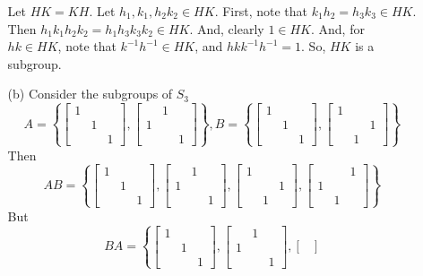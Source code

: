 \begin{itemize}
\begin{itemize}
Let $HK = KH$. Let $h_1, k_1, h_2k_2 \in HK$. First, note that $k_1h_2 = h_3k_3 \in HK$. Then $h_1k_1h_2k_2 = h_1h_3k_3k_2 \in HK$. And, clearly $1 \in HK$. And, for $hk \in HK$, note that $k^{-1}h^{-1} \in HK$, and $hkk^{-1}h^{-1} = 1$. So, $HK$ is a subgroup.
\item[(b)]
Consider the subgroups of $S_3$
$$A = \left\lbrace \begin{bmatrix}
1 \\
& 1 \\
& & 1
\end{bmatrix}, \begin{bmatrix}
& 1 \\
1 \\
& & 1
\end{bmatrix} \right\rbrace, B = \left\lbrace \begin{bmatrix}
1 \\
& 1 \\
& & 1
\end{bmatrix}, \begin{bmatrix}
1 \\
& & 1 \\
& 1
\end{bmatrix} \right\rbrace$$
Then
$$AB = \left\lbrace \begin{bmatrix}
1 \\
& 1 \\
& & 1
\end{bmatrix}, \begin{bmatrix}
& 1 \\
1 \\
& & 1
\end{bmatrix}, \begin{bmatrix}
1 \\
& & 1 \\
& 1
\end{bmatrix}, \begin{bmatrix}
& & 1 \\
1 \\
& 1
\end{bmatrix} \right\rbrace$$
But
$$BA = \left\lbrace \begin{bmatrix}
1 \\
& 1 \\
& & 1
\end{bmatrix}, \begin{bmatrix}
& 1 \\
1 \\
& & 1
\end{bmatrix}, \begin{bmatrix}

\end{bmatrix}$$
\end{itemize}
\end{itemize}
